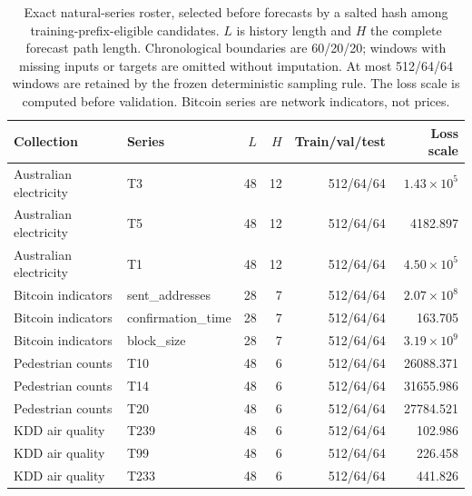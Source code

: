 \begin{table}[!htbp]
\centering\scriptsize\setlength{\tabcolsep}{4pt}
\caption{Exact natural-series roster, selected before forecasts by a salted hash among training-prefix-eligible candidates. $L$ is history length and $H$ the complete forecast path length. Chronological boundaries are 60/20/20; windows with missing inputs or targets are omitted without imputation. At most 512/64/64 windows are retained by the frozen deterministic sampling rule. The loss scale is computed before validation. Bitcoin series are network indicators, not prices.}
\label{tab:target-archive-windows}
\begin{tabular}{llrrrr}
\toprule
Collection & Series & $L$ & $H$ & Train/val/test & Loss scale \\
\midrule
Australian electricity & T3 & 48 & 12 & 512/64/64 & $1.43\times10^{5}$ \\
Australian electricity & T5 & 48 & 12 & 512/64/64 & 4182.897 \\
Australian electricity & T1 & 48 & 12 & 512/64/64 & $4.50\times10^{5}$ \\
Bitcoin indicators & sent\_addresses & 28 & 7 & 512/64/64 & $2.07\times10^{8}$ \\
Bitcoin indicators & confirmation\_time & 28 & 7 & 512/64/64 & 163.705 \\
Bitcoin indicators & block\_size & 28 & 7 & 512/64/64 & $3.19\times10^{9}$ \\
Pedestrian counts & T10 & 48 & 6 & 512/64/64 & 26088.371 \\
Pedestrian counts & T14 & 48 & 6 & 512/64/64 & 31655.986 \\
Pedestrian counts & T20 & 48 & 6 & 512/64/64 & 27784.521 \\
KDD air quality & T239 & 48 & 6 & 512/64/64 & 102.986 \\
KDD air quality & T99 & 48 & 6 & 512/64/64 & 226.458 \\
KDD air quality & T233 & 48 & 6 & 512/64/64 & 441.826 \\
\bottomrule
\end{tabular}
\end{table}

